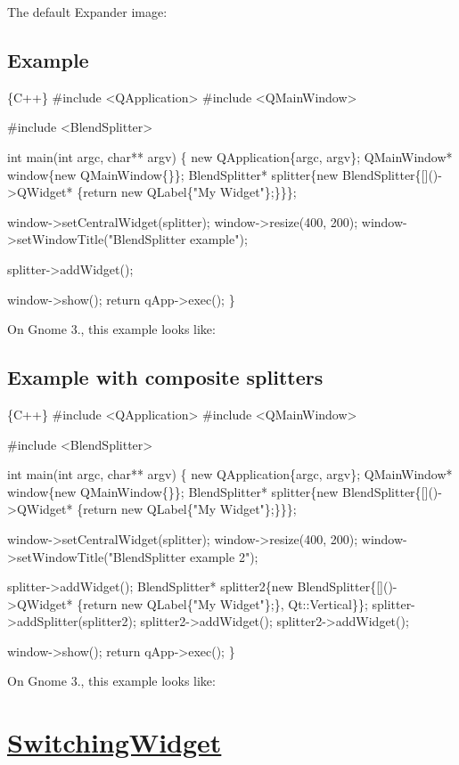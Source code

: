 The default Expander image\+:

 \subsection*{Example }


\begin{DoxyCode}
\{C++\}
#include <QApplication>
#include <QMainWindow>

#include <BlendSplitter>

int main(int argc, char** argv)
\{
    new QApplication\{argc, argv\};
    QMainWindow* window\{new QMainWindow\{\}\};
    BlendSplitter* splitter\{new BlendSplitter\{[]()->QWidget* \{return new QLabel\{"My Widget"\};\}\}\};

    window->setCentralWidget(splitter);
    window->resize(400, 200);
    window->setWindowTitle("BlendSplitter example");

    splitter->addWidget();

    window->show();
    return qApp->exec();
\}
\end{DoxyCode}
 On Gnome 3., this example looks like\+:

 \subsection*{Example with composite splitters }


\begin{DoxyCode}
\{C++\}
#include <QApplication>
#include <QMainWindow>

#include <BlendSplitter>

int main(int argc, char** argv)
\{
    new QApplication\{argc, argv\};
    QMainWindow* window\{new QMainWindow\{\}\};
    BlendSplitter* splitter\{new BlendSplitter\{[]()->QWidget* \{return new QLabel\{"My Widget"\};\}\}\};

    window->setCentralWidget(splitter);
    window->resize(400, 200);
    window->setWindowTitle("BlendSplitter example 2");

    splitter->addWidget();
    BlendSplitter* splitter2\{new BlendSplitter\{[]()->QWidget* \{return new QLabel\{"My Widget"\};\},
       Qt::Vertical\}\};
    splitter->addSplitter(splitter2);
    splitter2->addWidget();
    splitter2->addWidget();

    window->show();
    return qApp->exec();
\}
\end{DoxyCode}
 On Gnome 3., this example looks like\+:

 \section*{\hyperlink{class_switching_widget}{Switching\+Widget} }

